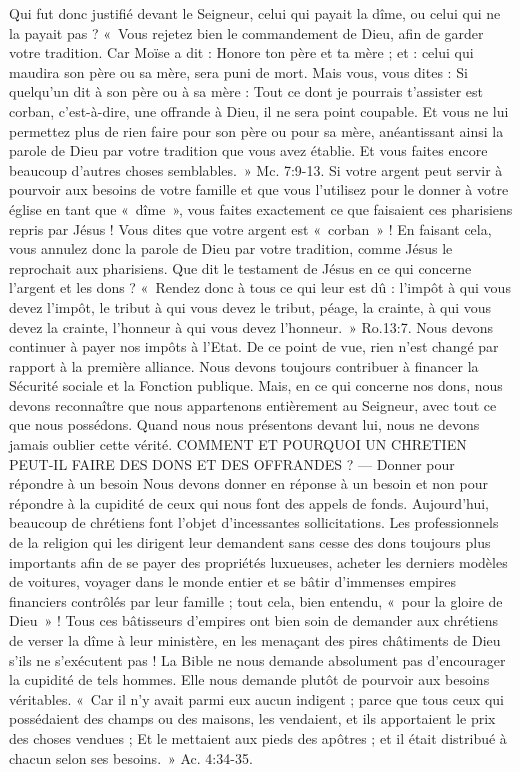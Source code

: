 \begin{multicols}{2}
{Qui fut donc justifié devant le Seigneur, celui qui payait la dîme, ou celui qui ne la payait pas ? «~Vous rejetez bien le commandement de Dieu, afin de garder 
votre tradition. Car Moïse a dit : Honore ton père et ta mère ; et : celui qui maudira son père ou sa mère, sera puni de mort. Mais vous, vous dites : Si quelqu'un dit à son père ou à sa mère : Tout ce dont je pourrais t’assister est corban, c’est-à-dire, une offrande à Dieu, il ne sera point coupable. 
Et vous ne lui permettez plus de rien faire pour son père ou pour sa mère, anéantissant ainsi la parole de Dieu par votre tradition que vous avez établie. Et vous faites encore beaucoup d’autres choses semblables.~» Mc. 7:9-13. Si votre argent peut servir à pourvoir aux besoins de votre famille et que vous l’utilisez pour le donner à votre église en tant que «~dîme~», vous faites exactement ce que faisaient ces pharisiens repris par Jésus ! Vous dites que votre argent est «~corban~» ! En faisant cela, vous annulez donc la parole de Dieu par votre tradition, comme Jésus le reprochait aux pharisiens.
Que dit le testament de Jésus en ce qui concerne l’argent et les dons ?
«~Rendez donc à tous ce qui leur est dû : l’impôt à qui vous devez l’impôt, le tribut à qui vous devez le tribut, péage, la crainte, à qui vous devez la crainte, l’honneur à qui vous devez l'honneur.~» Ro.13:7. Nous devons continuer à payer nos impôts à l’Etat. De ce point de vue, rien n’est changé par rapport à la première alliance. Nous devons toujours contribuer à financer la Sécurité sociale et la Fonction publique. Mais, en ce qui concerne nos dons, nous devons reconnaître que nous appartenons entièrement au Seigneur, avec tout ce que nous possédons. Quand nous nous présentons devant lui, nous ne devons jamais oublier cette vérité.
COMMENT ET POURQUOI UN CHRETIEN PEUT-IL FAIRE DES DONS ET DES OFFRANDES ?
— Donner pour répondre à un besoin
Nous devons donner en réponse à un besoin et non pour répondre à la cupidité de ceux qui nous font des appels de fonds. Aujourd’hui, beaucoup de chrétiens font l’objet d’incessantes sollicitations. Les professionnels de la religion qui les dirigent leur demandent sans cesse des dons toujours plus importants afin de se payer des propriétés luxueuses, acheter les derniers modèles de voitures, voyager dans le monde entier et se bâtir d’immenses empires financiers contrôlés par leur famille ; tout cela, bien entendu, «~pour la gloire de Dieu~» ! Tous ces bâtisseurs d’empires ont bien soin de demander aux chrétiens de verser la dîme à leur ministère, en les menaçant des pires châtiments de Dieu s’ils ne s’exécutent pas ! La Bible ne nous demande absolument pas d’encourager la cupidité de tels hommes. Elle nous demande plutôt de pourvoir aux besoins véritables. «~Car il n'y avait parmi eux aucun indigent ; parce que tous ceux qui possédaient des champs ou des maisons, les vendaient, et ils apportaient le prix des choses vendues ; Et le mettaient aux pieds des apôtres ; et il était distribué à chacun selon ses besoins.~» Ac. 4:34-35.
}
\end{multicols}
